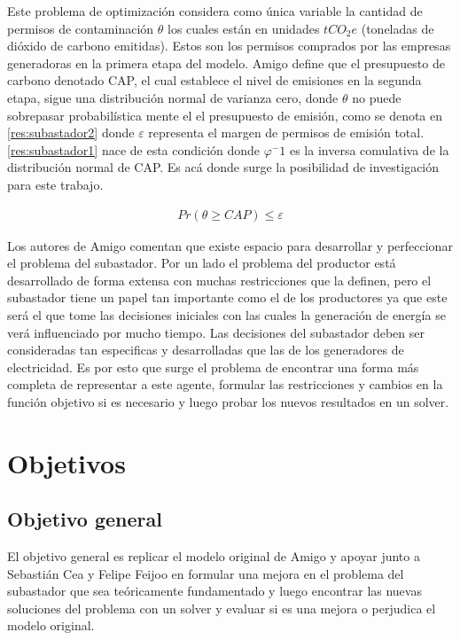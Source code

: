 Este problema de optimización considera como única variable la cantidad de permisos de contaminación $\theta$ los cuales están en unidades $tCO_2 e$ (toneladas de dióxido de carbono emitidas). Estos son los permisos comprados por las empresas generadoras en la primera etapa del modelo. Amigo define que el presupuesto de carbono denotado CAP, el cual establece el nivel de emisiones en la segunda etapa, sigue una distribución normal de varianza cero, donde $\theta$ no puede sobrepasar probabilística mente el el presupuesto de emisión, como se denota en \ref{res:subastador2} donde $\varepsilon$ representa el margen de permisos de emisión total. \ref{res:subastador1} nace de esta condición donde $\varphi^-1$ es la inversa comulativa de la distribución normal de CAP. Es acá donde surge la posibilidad de investigación para este trabajo. 

\begin{equation}
\begin{array}{cl}
    Pr(\theta \geq CAP)\leq \varepsilon \label{res:subastador2}
\end{array}
\end{equation}

Los autores de Amigo comentan que existe espacio para desarrollar y perfeccionar el problema del subastador. Por un lado el problema del productor está desarrollado de forma extensa con muchas restricciones que la definen, pero el subastador tiene un papel tan importante como el de los productores ya que este será el que tome las decisiones iniciales con las cuales la generación de energía se verá influenciado por mucho tiempo. Las decisiones del subastador deben ser consideradas tan especificas y desarrolladas que las de los generadores de electricidad. Es por esto que surge el problema de encontrar una forma más completa de representar a este agente, formular las restricciones y cambios en la función objetivo si es necesario y luego probar los nuevos resultados en un solver.




\section{Objetivos}
\subsection{Objetivo general}
El objetivo general es replicar el modelo original de Amigo y apoyar junto a Sebastián Cea y Felipe Feijoo en formular una mejora en el problema del subastador que sea teóricamente fundamentado y luego encontrar las nuevas soluciones del problema con un solver y evaluar si es una mejora o perjudica el modelo original. 
